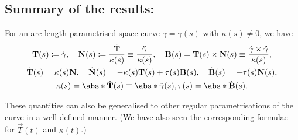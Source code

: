 \documentclass[11pt]{penrose}
\newcommand{\vT}{\vec{T}}
\newcommand{\vN}{\vec{N}}
\newcommand{\vB}{\vec{B}}
\begin{document}
\subsection*{Summary of the results:}
For an arc-length parametrised space curve $\gamma = \gamma(s)$ with $\kappa(s) \neq 0$, we have
\begin{gather*}
    \vT(s) \coloneq \dot{\gamma},
    \quad
    \vN(s) \coloneq \frac{\dot{\vT}}{\kappa(s)} \equiv \frac{\ddot{\gamma}}{\kappa(s)},
    \quad
    \vB(s) = \vT(s) \times \vN(s) \equiv \frac{\dot{\gamma} \times \ddot{\gamma}}{\kappa(s)},\\
    \dot{\vT}(s) = \kappa(s) \vN,
    \quad
    \dot{\vN}(s) = -\kappa(s) \vT(s) + \tau(s) \vB(s),
    \quad
    \dot{\vB}(s) = - \tau(s) \vN(s),\\
    \kappa(s) = \abs*{\dot{\vT}(s)} \equiv \abs*{\ddot{\gamma}(s)},
    \tau(s) = \abs*{\dot{\vB}(s)}.
\end{gather*}

These quantities can also be generalised to other regular parametrisations of the curve in a well-defined manner. (We have also seen the corresponding formulae for $\vT(t)$ and $\kappa(t)$.)
\end{document}
